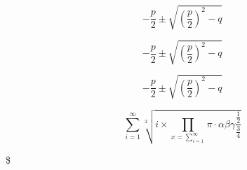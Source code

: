 \blindtext[12]

\begin{equation}\label{eq:pythagoras}
-\frac{p}{2} \pm \sqrt{ \left(\frac{p}{2}\right)^2 -q }
\end{equation}

\begin{equation}\label{eq:pythagoras}
-\frac{p}{2} \pm \sqrt{ \left(\frac{p}{2}\right)^2 -q }
\end{equation}

\begin{equation}\label{eq:pythagoras}
-\frac{p}{2} \pm \sqrt{ \left(\frac{p}{2}\right)^2 -q }
\end{equation}


\begin{equation}
\sum_{i=1}^{\infty} \sqrt[2\,]{i\times \prod_{x=\sum_{i=1}^{\infty}} \pi \cdot \alpha \beta \gamma 
\frac{\frac{1}{2}}{\frac{3}{4}}
}
\end{equation}

\$